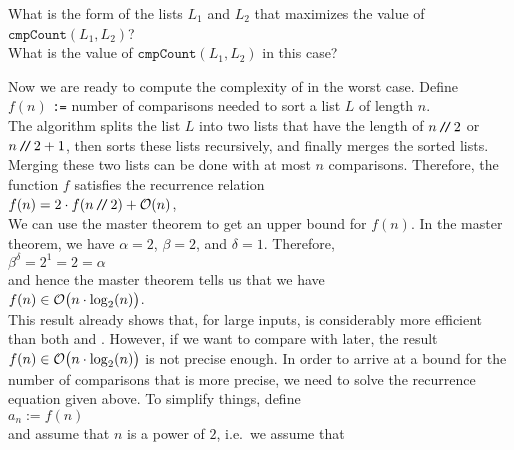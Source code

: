 \exercise
What is the form of the lists $L_1$ and $L_2$ that maximizes the value of 
\\[0.2cm]
\hspace*{1.3cm}
$\mathtt{cmpCount}(L_1, L_2)$?
\\[0.2cm]
What is the value of $\mathtt{cmpCount}(L_1, L_2)$ in this case? \eox
\vspace*{0.3cm}

\noindent
Now we are ready to compute the complexity of  in the worst case.  Define
\\[0.2cm]
\hspace*{1.3cm}
$f(n)$  \texttt{:=} number of comparisons needed to sort a list $L$ of length $n$.
\\[0.2cm]
The algorithm  
splits the list $L$ into two lists that have the length of $n\mbox{\,\texttt{/}$\!$\texttt{/}\,} 2$ or $n\mbox{\,\texttt{/}$\!$\texttt{/}\,} 2+1$, then sorts
these lists recursively, and finally merges the sorted lists.  Merging these two lists can be done with
at most $n$ comparisons.  Therefore, the function $f$ satisfies the recurrence relation
\\[0.2cm]
\hspace*{1.3cm}
$f(n) = 2 \cdot f(n \mbox{\,\texttt{/}$\!$\texttt{/}\,}  2) + \mathcal{O}(n)$,
\\[0.2cm]
We can use the master theorem to get an upper bound for $f(n)$.  In the master theorem, we have
$\alpha = 2$, $\beta = 2$, and $\delta = 1$. Therefore,
\\[0.2cm]
\hspace*{1.3cm}
$\beta^\delta = 2^1 = 2 = \alpha$
\\[0.2cm]
and hence the master theorem tells us that we have
\\[0.2cm]
\hspace*{1.3cm}
$f(n) \in \mathcal{O}\bigl(n \cdot \log_2(n) \bigr)$.
\\[0.2cm]
This result already shows that, for large inputs,  is considerably more efficient
than both  and .  However, if we want to compare
 with  later, the result $f(n) \in \mathcal{O}\bigl(n \cdot \log_2(n) \bigr)$ is
not precise enough.  In order to arrive at a bound for the number of comparisons that is more precise,
we need to solve the recurrence equation given above.  To simplify things,  define
\\[0.2cm]
\hspace*{1.3cm}
$a_n := f(n)$ 
\\[0.2cm]
and assume that $n$ is a power of $2$, i.e.~we assume that
